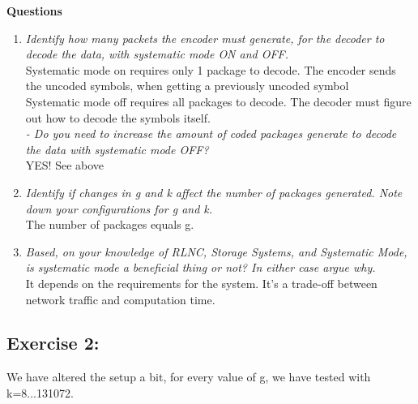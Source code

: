 \textbf{Questions}
\begin{enumerate}
    \item \textit{Identify how many packets the encoder must generate, for the decoder to decode the data, with systematic mode ON and OFF.}\\ 
    Systematic mode on requires only 1 package to decode. The encoder sends the uncoded symbols, when getting a previously uncoded symbol\\
    Systematic mode off requires all packages to decode. The decoder must figure out how to decode the symbols itself.\\
    \textit{ - Do you need to increase the amount of coded packages generate to decode the data with systematic mode OFF?}\\
    YES! See above
    \item \textit{Identify if changes in g and k affect the number of packages generated. Note down your configurations for g and k.}\\
    The number of packages equals g.
    \item \textit{Based, on your knowledge of RLNC, Storage Systems, and Systematic Mode, is systematic mode a beneficial thing or not? In either case argue why.}\\
    It depends on the requirements for the system. It's a trade-off between network traffic and computation time.
\end{enumerate}

\subsection{Exercise 2:}
We have altered the setup a bit, for every value of g, we have tested with k=8...131072.

